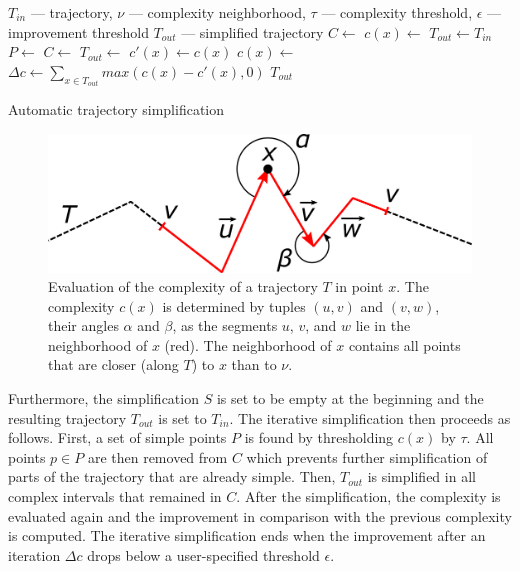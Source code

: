 \begin{algorithm} [htb]
  \begin{algorithmic}[1]
	  \Require $T_{in}$ --- trajectory, $\nu$ --- complexity neighborhood, $\tau$ --- complexity threshold, $\epsilon$ --- improvement threshold
	  \Ensure $T_{out}$ --- simplified trajectory
			\State $C \gets$  
			\State $c(x) \gets$ 
			\State
			\State $T_{out} \gets T_{in}$
			\Repeat
			  \State $P \gets$ 
				\State $C \gets$ 
			  \State
					\State $T_{out} \gets$ 
			  \EndFor
				\State
				\State $c'(x) \gets c(x)$ %
				\State $c(x) \gets$ 
				\State
				\State $\Delta c \gets \sum_{x \in T_{out}}{max(c(x) - c'(x), 0)}$
				\State {}
			\State
			\State \Return $T_{out}$
		\EndProcedure
  \end{algorithmic}
	\caption{Automatic trajectory simplification}
  \label{alg:auto-simplify}
\end{algorithm}

\begin{figure}
	\includegraphics[width=0.95\linewidth]{img/complexity.png}
\caption{Evaluation of the complexity of a trajectory $T$ in point $x$.
The complexity $c(x)$ is determined by tuples $(u, v)$ and $(v, w)$, \ie their angles $\alpha$ and $\beta$, as the segments $u$, $v$, and $w$ lie in the neighborhood of $x$ (red).
The neighborhood of $x$ contains all points that are closer (along $T$) to $x$ than to $\nu$.}
\label{fig:complexity}
\end{figure}

Furthermore, the simplification $S$ is set to be empty at the beginning and the resulting trajectory $T_{out}$ is set to $T_{in}$.
The iterative simplification then proceeds as follows.
First, a set of simple points $P$ is found by thresholding $c(x)$ by $\tau$.
All points $p \in P$ are then removed from $C$ which prevents further simplification of parts of the trajectory that are already simple.
Then, $T_{out}$ is simplified in all complex intervals that remained in $C$.
After the simplification, the complexity is evaluated again and the improvement in comparison with the previous complexity is computed.
The iterative simplification ends when the improvement after an iteration $\Delta c$ drops below a user-specified threshold $\epsilon$.

